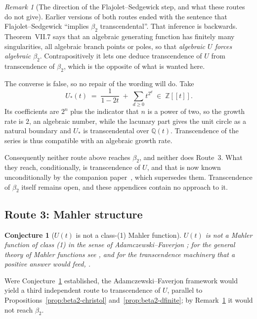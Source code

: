 \documentclass[11pt]{article}
\theoremstyle{plain}
\newtheorem{conjecture}[theorem]{Conjecture}
\theoremstyle{definition}
\theoremstyle{remark}
\newtheorem{remark}[theorem]{Remark}
\begin{document}
\begin{remark}[The direction of the Flajolet--Sedgewick step, and what these routes do not give]
\label{rem:fs-direction}
Earlier versions of both routes ended with the sentence that
Flajolet--Sedgewick \cite[Thm.~VII.7]{FlajoletSedgewick} ``implies
$\beta_2$ transcendental''.  That inference is backwards. Theorem~VII.7
says that an algebraic generating function has finitely many
singularities, all algebraic branch points or poles, so that
\emph{algebraic $U$ forces algebraic $\beta_2$}.  Contrapositively it
lets one deduce transcendence of $U$ from transcendence of $\beta_2$,
which is the opposite of what is wanted here.

The converse is false, so no repair of the wording will do. Take
\[
   U_\ast(t) \;=\; \frac{1}{1-2t} \;+\; \sum_{d \ge 0} t^{2^d}
   \;\in\; \mathbb{Z}[[t]] .
\]
Its coefficients are $2^n$ plus the indicator that $n$ is a power of
two, so the growth rate is $2$, an algebraic number, while the lacunary
part gives the unit circle as a natural boundary and $U_\ast$ is
transcendental over $\mathbb{Q}(t)$. Transcendence of the series is thus
compatible with an algebraic growth rate.

Consequently neither route above reaches $\beta_2$, and neither does
Route~3. What they reach, conditionally, is transcendence of $U$, and
that is now known unconditionally by the companion
paper~\cite{Bonfioli2026b}, which supersedes them. Transcendence of
$\beta_2$ itself remains open, and these appendices contain no approach
to it.
\end{remark}

\subsection{Route 3: Mahler structure}
\label{ssec:mahler-route}

\begin{conjecture}[$U(t)$ is not a class-(1) Mahler function]
\label{conj:not-class1-mahler}
$U(t)$ is not a Mahler function of class (1) in the sense of
Adamczewski--Faverjon \cite{AdamczewskiFaverjon}; for the general theory of
Mahler functions see \cite{Mahler1929,Nishioka,BellCoons,AdamczewskiBell2015},
and for the transcendence machinery that a positive answer would feed,
\cite{Nesterenko1996}.
\end{conjecture}

Were Conjecture~\ref{conj:not-class1-mahler} established, the
Adamczewski--Faverjon framework would yield a third independent route to
transcendence of $U$, parallel to Propositions~\ref{prop:beta2-christol}
and~\ref{prop:beta2-dfinite}; by Remark~\ref{rem:fs-direction} it would not
reach $\beta_2$.
\end{document}
